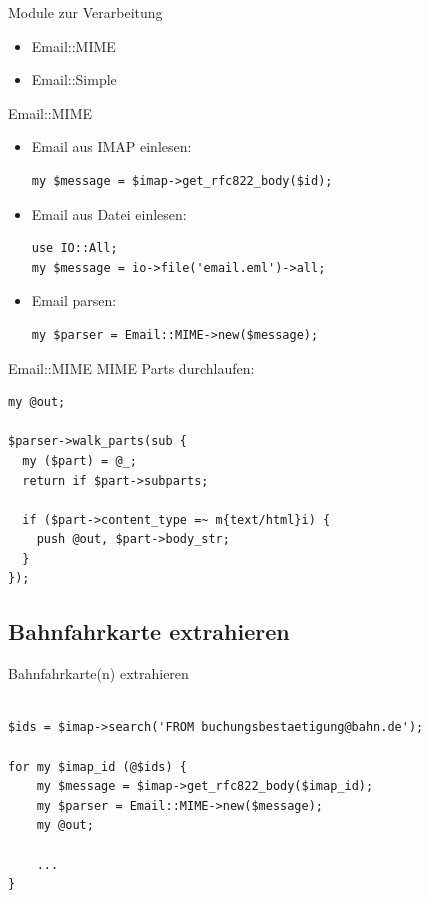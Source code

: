 \begin{frame}{Module zur Verarbeitung}
  \begin{itemize}
  \item Email::MIME
  \item Email::Simple
  \end{itemize}
\end{frame}

\begin{frame}[fragile]{Email::MIME}
  \begin{itemize}
    \item   Email aus IMAP einlesen:

\begin{verbatim}
my $message = $imap->get_rfc822_body($id);
\end{verbatim}

  \item Email aus Datei einlesen:

\begin{verbatim}
use IO::All;
my $message = io->file('email.eml')->all;
\end{verbatim}

  \item Email parsen:

\begin{verbatim}
my $parser = Email::MIME->new($message);
\end{verbatim}

\end{itemize}  
\end{frame}

\begin{frame}[fragile]{Email::MIME}
MIME Parts durchlaufen:

\begin{verbatim}
my @out;

$parser->walk_parts(sub {
  my ($part) = @_;
  return if $part->subparts;

  if ($part->content_type =~ m{text/html}i) {
    push @out, $part->body_str;
  }
});
\end{verbatim}
\end{frame}

\subsection{Bahnfahrkarte extrahieren}

\begin{frame}[fragile]{Bahnfahrkarte(n) extrahieren}
\begin{verbatim}

$ids = $imap->search('FROM buchungsbestaetigung@bahn.de');

for my $imap_id (@$ids) {
    my $message = $imap->get_rfc822_body($imap_id);
    my $parser = Email::MIME->new($message);
    my @out;

    ...
}

\end{verbatim}
\end{frame}

